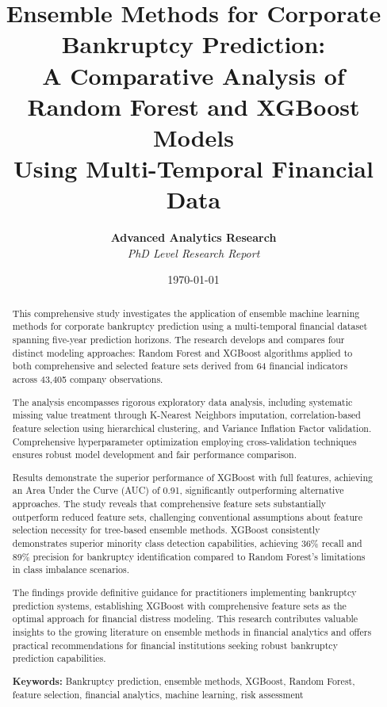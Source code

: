 \documentclass[12pt,a4paper]{report}
\title{
    \Large \textbf{Ensemble Methods for Corporate Bankruptcy Prediction:} \\
    \large A Comparative Analysis of Random Forest and XGBoost Models \\
    \large Using Multi-Temporal Financial Data
}
\author{
    \textbf{Advanced Analytics Research} \\
    \textit{PhD Level Research Report}
}
\date{\today}
\begin{document}
\maketitle
\thispagestyle{empty}

\newpage
\tableofcontents
\newpage

\begin{abstract}
This comprehensive study investigates the application of ensemble machine learning methods for corporate bankruptcy prediction using a multi-temporal financial dataset spanning five-year prediction horizons. The research develops and compares four distinct modeling approaches: Random Forest and XGBoost algorithms applied to both comprehensive and selected feature sets derived from 64 financial indicators across 43,405 company observations.

The analysis encompasses rigorous exploratory data analysis, including systematic missing value treatment through K-Nearest Neighbors imputation, correlation-based feature selection using hierarchical clustering, and Variance Inflation Factor validation. Comprehensive hyperparameter optimization employing cross-validation techniques ensures robust model development and fair performance comparison.

Results demonstrate the superior performance of XGBoost with full features, achieving an Area Under the Curve (AUC) of 0.91, significantly outperforming alternative approaches. The study reveals that comprehensive feature sets substantially outperform reduced feature sets, challenging conventional assumptions about feature selection necessity for tree-based ensemble methods. XGBoost consistently demonstrates superior minority class detection capabilities, achieving 36\% recall and 89\% precision for bankruptcy identification compared to Random Forest's limitations in class imbalance scenarios.

The findings provide definitive guidance for practitioners implementing bankruptcy prediction systems, establishing XGBoost with comprehensive feature sets as the optimal approach for financial distress modeling. This research contributes valuable insights to the growing literature on ensemble methods in financial analytics and offers practical recommendations for financial institutions seeking robust bankruptcy prediction capabilities.

\textbf{Keywords:} Bankruptcy prediction, ensemble methods, XGBoost, Random Forest, feature selection, financial analytics, machine learning, risk assessment
\end{abstract}

\newpage





\end{document}
